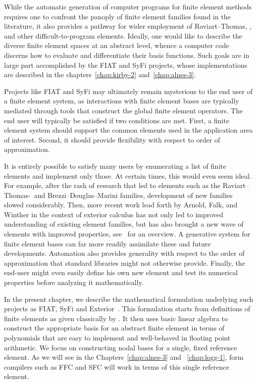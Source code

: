 While the automatic generation of computer programs for finite element
methods requires one to confront the panoply of finite element
families found in the literature, it also provides a pathway for wider
employment of Raviart--Thomas, \nedelec, and other
difficult-to-program elements.  Ideally, one would like to describe
the diverse finite element spaces at an abstract level, whence a
computer code discerns how to evaluate and differentiate their basis
functions. Such goals are in large part accomplished by the FIAT and
SyFi projects, whose implementations are described in the
chapters~\ref{chap:kirby-2} and~\ref{chap:alnes-3}.

Projects like FIAT and SyFi may ultimately remain mysterious to the end
user of a finite element system, as interactions with finite element
bases are typically mediated through tools that construct the global
finite element operators.  The end user will typically be satisfied if
two conditions are met.  First, a finite element system should support
the common elements used in the application area of interest.  Second,
it should provide flexibility with respect to order of approximation.

It is entirely possible to satisfy many users by \apriori{}
enumerating a list of finite elements and implement only those.  At
certain times, this would even seem ideal.  For example, after the
rash of research that led to elements such as the
Raviart--Thomas-\nedelec\ and Brezzi--Douglas--Marini families,
development of new families slowed considerably.  Then, more recent
work lead forth by Arnold, Falk, and Winther in the context of
exterior calculus has not only led to improved understanding of
existing element families, but has also brought a new wave of elements
with improved properties, see~\citet{ArnoldFalkWinther2006} for an
overview.  A generative system for finite element bases can far more
readily assimilate these and future developments.  Automation also
provides generality with respect to the order of approximation that
standard libraries might not otherwise provide. Finally, the end-user
might even easily define his own new element and test its numerical
properties before analyzing it mathematically.

In the present chapter, we describe the mathematical formulation
underlying such projects as FIAT, SyFi and
Exterior~\citep{LoggMardal2009}.  This formulation starts from
definitions of finite elements as given classically by
\citet{Ciarlet2002}.  It then uses basic linear algebra to construct
the appropriate basis for an abstract finite element in terms of
polynomials that are easy to implement and well-behaved in floating
point arithmetic.  We focus on constructing nodal bases for a single,
fixed reference element.  As we will see in the
Chapters~\ref{chap:alnes-3} and ~\ref{chap:logg-1}, form compilers
such as FFC and SFC will work in terms of this single reference
element.

